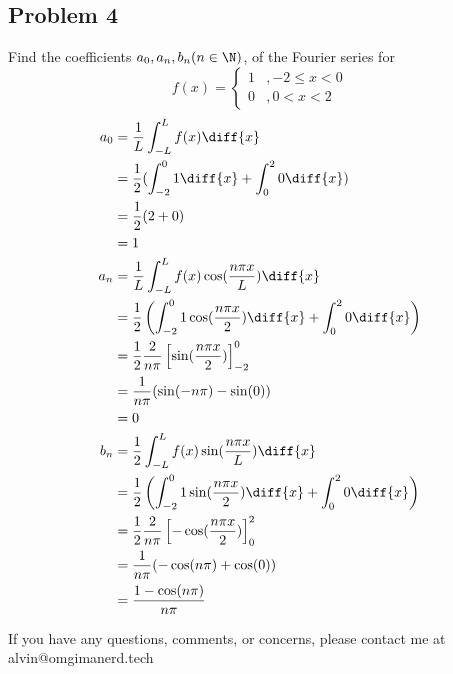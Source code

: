 \documentclass{math}
\begin{document}
\subsection*{Problem 4}
Find the coefficients \( a_0, a_n, b_n (n\in\N) \), of the Fourier series for
\[ f(x) = \begin{cases}
  1 &, -2\le x<0 \\
  0 &, 0<x<2
\end{cases} \]
\begin{align*}
  a_0 &= \frac{1}{L}\int_{-L}^{L}f(x)\diff{x} \\
  &= \frac{1}{2}(\int_{-2}^{0}1\diff{x}+\int_{0}^{2}0\diff{x}) \\
  &= \frac{1}{2}(2+0) \\
  &= 1 \\
  a_n &= \frac{1}{L}\int_{-L}^{L}f(x)\cos(\frac{n\pi x}{L})\diff{x} \\
  &= \frac{1}{2}\left(\int_{-2}^{0}1\cos(\frac{n\pi x}{2})\diff{x}+
    \int_{0}^{2}0\diff{x}\right) \\
  &= \frac{1}{2}\frac{2}{n\pi}\left[\sin(\frac{n\pi x}{2})\right]_{-2}^{0} \\
  &= \frac{1}{n\pi}(\sin(-n\pi)-\sin(0)) \\
  &= 0 \\
  b_n &= \frac{1}{2}\int_{-L}^{L}f(x)\sin(\frac{n\pi x}{L})\diff{x} \\
  &= \frac{1}{2}\left(\int_{-2}^{0}1\sin(\frac{n\pi x}{2})\diff{x}+
    \int_{0}^{2}0\diff{x}\right) \\
  &= \frac{1}{2}\frac{2}{n\pi}\left[-\cos(\frac{n\pi x}{2})\right]_{0}^{2} \\
  &= \frac{1}{n\pi}(-\cos(n\pi)+\cos(0)) \\
  &= \frac{1-\cos(n\pi)}{n\pi}
\end{align*}

\begin{center}
  If you have any questions, comments, or concerns, please contact me at
  alvin@omgimanerd.tech
\end{center}
\end{document}

